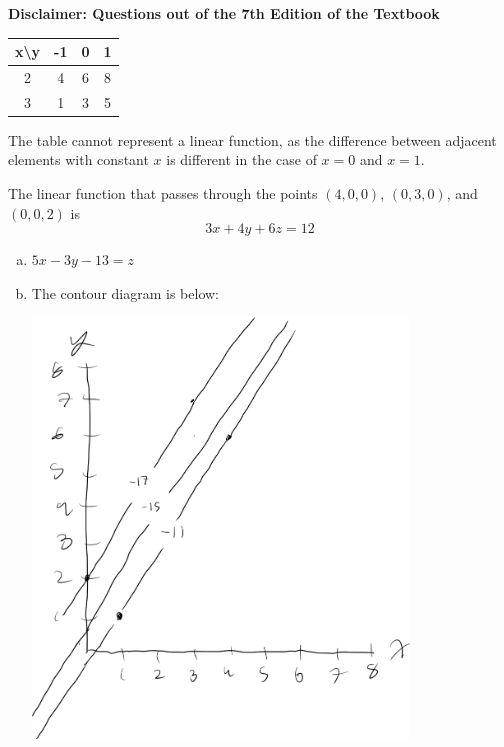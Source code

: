 \documentclass[10pt]{extarticle}
\title{}
\author{Avinash Iyer}
\date{}
\begin{document}
  \textbf{Disclaimer: Questions out of the 7th Edition of the Textbook}
  \begin{problem}{12.4}
    \begin{description}[font=\normalfont]
      \item[2:] \hfill
        \begin{center}
          \begin{tabular}{c|ccc}
            x\textbackslash y & -1 & 0 & 1 \\
            \hline
            2 & 4 & 6 & 8 \\
            3 & 1 & 3 & 5\\
            \hline
          \end{tabular}
        \end{center}
      \item[6:] The table cannot represent a linear function, as the difference between adjacent elements with constant $x$ is different in the case of $x=0$ and $x=1$.
      \item[8:] The linear function that passes through the points $(4,0,0)$, $(0,3,0)$, and $(0,0,2)$ is
        \[
          3x + 4y + 6z = 12
        \] 
      \item[12:] \hfill
        \begin{enumerate}[(a)]
          \item $5x - 3y - 13 = z$
          \item The contour diagram is below:
            \begin{center}
              \includegraphics[width=10cm]{images/12_4_12_b.png}

\end{center}
\end{enumerate}
\end{description}
\end{problem}
\end{document}
